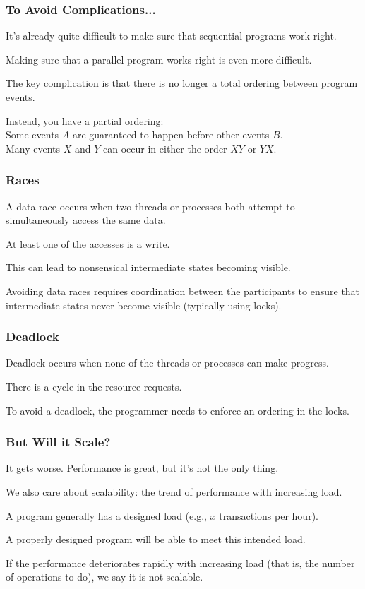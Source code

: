 \begin{frame}
\frametitle{To Avoid Complications...}

 It's already quite difficult to make sure that
sequential programs work right. 

Making sure that a parallel program
works right is even more difficult.

The key complication is that there is no longer a total ordering between
program events. 

Instead, you have a partial ordering:\\
\quad Some events $A$ are guaranteed to happen before other events $B$.\\
\quad Many events $X$  and $Y$ can occur in either the order $XY$ or $YX$.

\end{frame}



\begin{frame}
\frametitle{Races}

 A \alert{data race} occurs when two threads or processes both attempt to
simultaneously access the same data.

At least one of the accesses is a write. 

This can lead to nonsensical intermediate states becoming
visible.

Avoiding data races requires
coordination between the participants to ensure that intermediate
states never become visible (typically using locks). 


\end{frame}



\begin{frame}
\frametitle{Deadlock}

 \alert{Deadlock}
occurs when none of the threads or processes can make progress.

There is a cycle in the resource requests. 

To avoid a deadlock, the programmer needs to enforce an ordering in the locks.


\end{frame}



\begin{frame}
\frametitle{But Will it Scale?}

It gets worse. Performance is great, but it's not the only thing. 

We also care about \alert{scalability}: the trend of performance with increasing load. 

A program generally has a designed load (e.g., $x$ transactions per hour). 

A properly designed program will be able to meet this intended load. 

If the performance deteriorates rapidly with increasing load (that is, the number of operations to do), we say it is \alert{not scalable}.

\end{frame}



